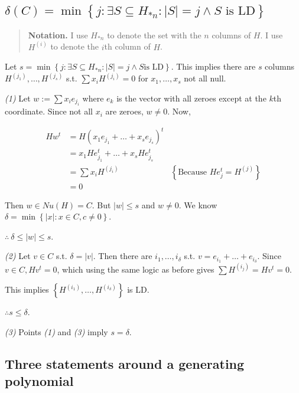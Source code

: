 \documentclass[a4paper, 12pt]{article}
\begin{document}
\pagebreak


\subsection{$\delta(C) = \min \left\{ j : \exists S \subseteq H_{*n} : |S| = j \land  S \text{ is LD} \right\} $}

\begin{quote}
    \textbf{Notation.} I use $H_{*n}$ to denote the set with the $n$ columns
    of $H$. I use $H^{(i)}$ to denote the $i$th column of $H$.
\end{quote}

Let $s = \min \left\{ j : \exists S \subseteq H_{*n} : |S| = j \land  S \text{
is LD} \right\} $. This implies there are $s$ columns $H^{(j_1)}, \ldots,
H^{(j_s)}$ s.t. $\sum x_i H^{( j_i )} = 0$ for $x_1, \ldots, x_s$ not all null.

\textit{(1)} Let $w := \sum x_i e_{j_i}$ where $e_{k}$ is the vector with all
zeroes except at the $k$th coordinate. Since not all $x_i$ are zeroes, $w \neq
0$. Now, 

\begin{align*}
    Hw^t &= H \left( x_1 e_{j_1} + \ldots + x_s e_{j_s} \right)^t \\ 
         &= x_1 H e_{j_1}^t + \ldots + x_s H e_{j_s}^t \\ 
         &= \sum x_i H^{(j_i)} &\left\{ \text{Because } He_j^t = H^{(j)} \right\}  \\ 
         &= 0
\end{align*}

Then $w \in Nu(H) = C$. But $|w| \leq s$ and $w \neq 0$. We know $\delta = \min
\left\{ |x| : x \in C, c \neq 0 \right\} $.

$\therefore ~ \delta \leq |w| \leq s$.

\textit{(2)} Let $v \in  C$ s.t. $\delta = |v|$. Then there are 
$i_1, \ldots, i_{\delta}$ s.t. $v = e_{i_1} + \ldots + e_{i_\delta}$.
Since $v \in  C, Hv^t = 0$, which using the same 
logic as before gives $\sum H^{(i_j)} = Hv^t = 0$.

This implies $\left\{ H^{(i_1)}, \ldots, H^{(i_{\delta})} \right\} $ is LD.

$\therefore  s \leq \delta$.

\textit{(3)} Points \textit{(1)} and \textit{(3)} imply $s = \delta$.

\pagebreak 

\subsection{Three statements around a generating polynomial}
\end{document}
